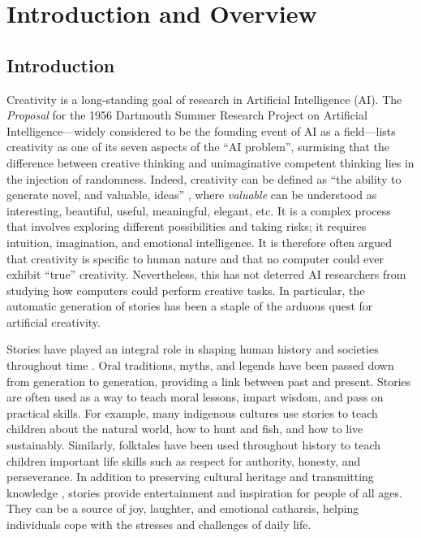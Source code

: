 \chapter{Introduction and Overview}
\minitoc
\newpage

\section{Introduction}

Creativity is a long-standing goal of research in Artificial Intelligence (AI). The \textit{Proposal} \citep{mccarthy2006proposal} for the 1956 Dartmouth Summer Research Project on Artificial Intelligence---widely considered to be the founding event of AI as a field---lists creativity as one of its seven aspects of the ``AI problem'', surmising that the difference between creative thinking and unimaginative competent thinking lies in the injection of randomness. Indeed, creativity can be defined as ``the ability to generate novel, and valuable, ideas'' \citep{boden2009computer}, where \emph{valuable} can be understood as interesting, beautiful, useful, meaningful, elegant, etc. It is a complex process that involves exploring different possibilities and taking risks; it requires intuition, imagination, and emotional intelligence. It is therefore often argued that creativity is specific to human nature and that no computer could ever exhibit ``true'' creativity. Nevertheless, this has not deterred AI researchers from studying how computers could perform creative tasks. In particular, the automatic generation of stories has been a staple of the arduous quest for artificial creativity.

Stories have played an integral role in shaping human history and societies throughout time \citep{sinclair2005impact}. Oral traditions, myths, and legends have been passed down from generation to generation, providing a link between past and present. Stories are often used as a way to teach moral lessons, impart wisdom, and pass on practical skills. For example, many indigenous cultures use stories to teach children about the natural world, how to hunt and fish, and how to live sustainably. Similarly, folktales have been used throughout history to teach children important life skills such as respect for authority, honesty, and perseverance. In addition to preserving cultural heritage \citep{paolini2014storytelling} and transmitting knowledge \citep{kreiswirth2000merely}, stories provide entertainment and inspiration for people of all ages. They can be a source of joy, laughter, and emotional catharsis, helping individuals cope with the stresses and challenges of daily life. 

